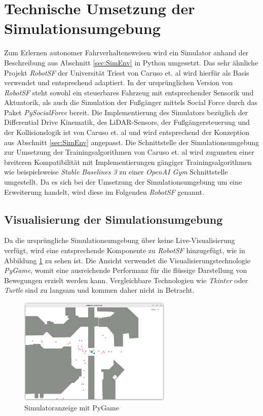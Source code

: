 
\section{Technische Umsetzung der Simulationsumgebung}
Zum Erlernen autonomer Fahrverhaltensweisen wird ein Simulator anhand der Beschreibung
aus Abschnitt \ref{sec:SimEnv} in Python umgesetzt. Das sehr ähnliche Projekt \emph{RobotSF}
der Universität Triest von Caruso et. al \cite{machines11020268} wird hierfür als Basis verwendet
und entsprechend adaptiert. In der ursprünglichen Version von \emph{RobotSF} steht sowohl
ein steuerbares Fahrzeug mit entsprechender Sensorik und Aktuatorik, als auch die
Simulation der Fußgänger mittels Social Force durch das Paket \emph{PySocialForce}
\cite{gao2020pysf} bereit. Die Implementierung des Simulators bezüglich der Differential
Drive Kinematik, des LiDAR-Sensors, der Fußgängersteuerung und der Kollisionslogik ist
von Caruso et. al und wird entsprechend der Konzeption aus Abschnitt \ref{sec:SimEnv} angepasst.
Die Schnittstelle der Simulationsumgebung zur Umsetzung der Trainingsalgorithmen von
Caruso et. al wird zugunsten einer breiteren Kompatibilität mit Implementierungen gängiger
Trainingsalgorithmen wie beispielsweise \emph{Stable Baselines 3} \cite{raffin2021sb3}
zu einer \emph{OpenAI Gym} Schnittstelle \cite{brockman2016openai} umgestellt. Da es sich
bei der Umsetzung der Simulationsumgebung um eine Erweiterung handelt, wird diese
im Folgenden \emph{RobotSF} genannt.

\subsection{Visualisierung der Simulationsumgebung}
Da die ursprüngliche Simulationsumgebung über keine Live-Visualisierung verfügt,
wird eine entsprechende Komponente zu \emph{RobotSF} hinzugefügt, wie in Abbildung
\ref{fig:SimPyGame} zu sehen ist. Die Ansicht verwendet die Visualisierungstechnologie
\emph{PyGame}, womit eine ausreichende Performanz für die flüssige Darstellung von
Bewegungen erzielt werden kann. Vergleichbare Technologien wie \emph{Tkinter} oder
\emph{Turtle} sind zu langsam und kommen daher nicht in Betracht.\\

\begin{figure}[h]
  \centering
  \includegraphics[width = 0.65\textwidth]{imgs/simulator_reworked}
  \caption{Simulatoranzeige mit PyGame}
  \label{fig:SimPyGame}
\end{figure}

